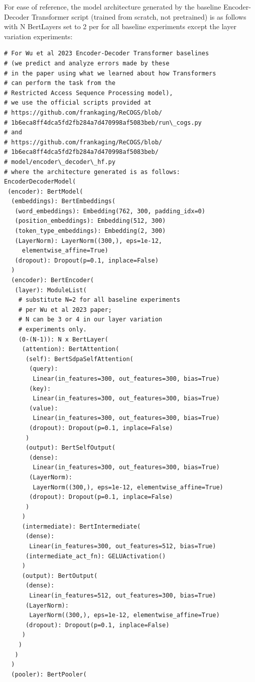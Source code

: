 \documentclass[11pt]{article}
\begin{document}
For ease of reference, the model architecture generated by the \citep{Wu2023} baseline Encoder-Decoder Transformer script (trained from scratch, not pretrained) is as follows with N BertLayers set to 2 per \citep{Wu2023} for all baseline experiments except the layer variation experiments:
\begin{tiny}
\begin{verbatim}
# For Wu et al 2023 Encoder-Decoder Transformer baselines 
# (we predict and analyze errors made by these 
# in the paper using what we learned about how Transformers 
# can perform the task from the 
# Restricted Access Sequence Processing model),
# we use the official scripts provided at 
# https://github.com/frankaging/ReCOGS/blob/
# 1b6eca8ff4dca5fd2fb284a7d470998af5083beb/run\_cogs.py
# and 
# https://github.com/frankaging/ReCOGS/blob/
# 1b6eca8ff4dca5fd2fb284a7d470998af5083beb/
# model/encoder\_decoder\_hf.py
# where the architecture generated is as follows:
EncoderDecoderModel(
 (encoder): BertModel(
  (embeddings): BertEmbeddings(
   (word_embeddings): Embedding(762, 300, padding_idx=0)
   (position_embeddings): Embedding(512, 300)
   (token_type_embeddings): Embedding(2, 300)
   (LayerNorm): LayerNorm((300,), eps=1e-12, 
     elementwise_affine=True)
   (dropout): Dropout(p=0.1, inplace=False)
  )
  (encoder): BertEncoder(
   (layer): ModuleList(
    # substitute N=2 for all baseline experiments
    # per Wu et al 2023 paper; 
    # N can be 3 or 4 in our layer variation 
    # experiments only.
    (0-(N-1)): N x BertLayer(
     (attention): BertAttention(
      (self): BertSdpaSelfAttention(
       (query): 
        Linear(in_features=300, out_features=300, bias=True)
       (key): 
        Linear(in_features=300, out_features=300, bias=True)
       (value): 
        Linear(in_features=300, out_features=300, bias=True)
       (dropout): Dropout(p=0.1, inplace=False)
      )
      (output): BertSelfOutput(
       (dense): 
        Linear(in_features=300, out_features=300, bias=True)
       (LayerNorm): 
        LayerNorm((300,), eps=1e-12, elementwise_affine=True)
       (dropout): Dropout(p=0.1, inplace=False)
      )
     )
     (intermediate): BertIntermediate(
      (dense): 
       Linear(in_features=300, out_features=512, bias=True)
      (intermediate_act_fn): GELUActivation()
     )
     (output): BertOutput(
      (dense): 
       Linear(in_features=512, out_features=300, bias=True)
      (LayerNorm): 
       LayerNorm((300,), eps=1e-12, elementwise_affine=True)
      (dropout): Dropout(p=0.1, inplace=False)
     )
    )
   )
  )
  (pooler): BertPooler(

\end{verbatim}
\end{tiny}
\end{document}
